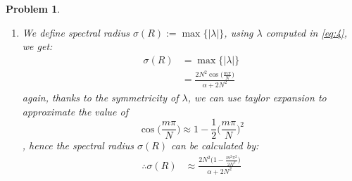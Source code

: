\documentclass[a4paper,12pt]{article}
\newtheorem{prob}{Problem}[]
\begin{document}
\begin{prob}
\begin{enumerate}[label=(\alph*)]
		\item We define spectral radius $\sigma(R) := \max\{|\lambda|\}$, using $\lambda$ computed in \eqref{eq:4}, we get:
		\begin{equation*}
		\begin{aligned}
		\sigma(R) &= \max\{|\lambda|\}\\
		&= \frac{2N^2 \cos\big(\frac{m\pi}{N}\big)}{\alpha + 2N^2}
		\end{aligned}
		\end{equation*}
		again, thanks to the symmetricity of $\lambda$, we can use taylor expansion to approximate the value of $$\cos\bigg(\frac{m\pi}{N}\bigg) \approx 1 - \frac{1}{2}\bigg(\frac{m\pi}{N}\bigg)^2$$, hence the spectral radius $\sigma(R)$ can be calculated by:
		\begin{equation*}
		\begin{aligned}
		\therefore\sigma(R) &\approx \frac{2N^2 \bigg( 1 - \frac{m^2\pi^2}{2N^2}\bigg)}{\alpha + 2N^2}\\
		\end{aligned}
		\end{equation*}
	\end{enumerate}
\end{prob}
\newpage
\end{document}
